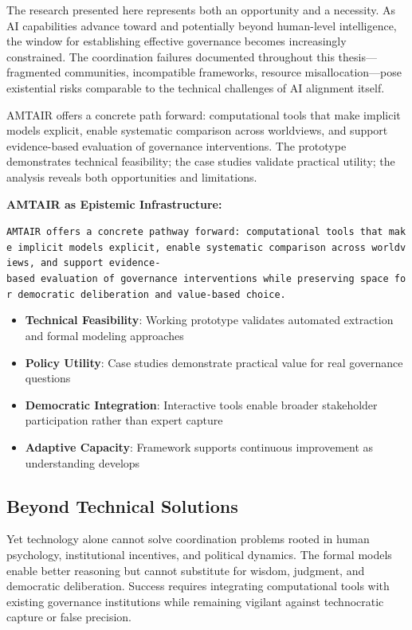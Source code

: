 \documentclass[
  11pt,
  letterpaper,
]{book}
\providecommand{\tightlist}{%
  \setlength{\itemsep}{0pt}\setlength{\parskip}{0pt}}
\begin{document}
The research presented here represents both an opportunity and a
necessity. As AI capabilities advance toward and potentially beyond
human-level intelligence, the window for establishing effective
governance becomes increasingly constrained. The coordination failures
documented throughout this thesis---fragmented communities, incompatible
frameworks, resource misallocation---pose existential risks comparable
to the technical challenges of AI alignment itself.

AMTAIR offers a concrete path forward: computational tools that make
implicit models explicit, enable systematic comparison across
worldviews, and support evidence-based evaluation of governance
interventions. The prototype demonstrates technical feasibility; the
case studies validate practical utility; the analysis reveals both
opportunities and limitations.

\textbf{AMTAIR as Epistemic Infrastructure:}

\texttt{AMTAIR\ offers\ a\ concrete\ pathway\ forward:\ computational\ tools\ that\ make\ implicit\ models\ explicit,\ enable\ systematic\ comparison\ across\ worldviews,\ and\ support\ evidence-based\ evaluation\ of\ governance\ interventions\ while\ preserving\ space\ for\ democratic\ deliberation\ and\ value-based\ choice.}

\begin{itemize}
\tightlist
\item
  \textbf{Technical Feasibility}: Working prototype validates automated
  extraction and formal modeling approaches
\item
  \textbf{Policy Utility}: Case studies demonstrate practical value for
  real governance questions
\item
  \textbf{Democratic Integration}: Interactive tools enable broader
  stakeholder participation rather than expert capture
\item
  \textbf{Adaptive Capacity}: Framework supports continuous improvement
  as understanding develops
\end{itemize}

\subsection{Beyond Technical Solutions}\label{sec-beyond-technical}

Yet technology alone cannot solve coordination problems rooted in human
psychology, institutional incentives, and political dynamics. The formal
models enable better reasoning but cannot substitute for wisdom,
judgment, and democratic deliberation. Success requires integrating
computational tools with existing governance institutions while
remaining vigilant against technocratic capture or false precision.
\end{document}
